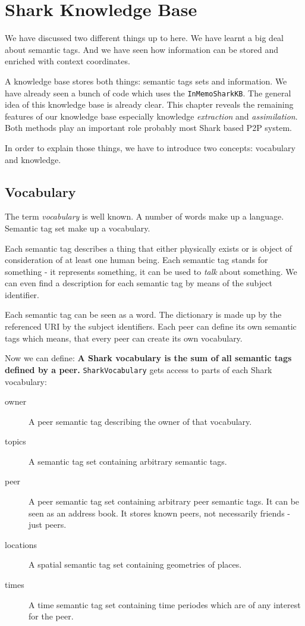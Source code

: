 \chapter{Shark Knowledge Base}
\label{sec:sharkkb}
We have discussed two different things up to here. We have learnt a big deal about semantic tags. And we have seen how information can be stored and enriched with context coordinates.

A knowledge base stores both things: semantic tags sets and information. We have already seen a bunch of code which uses the {\tt InMemoSharkKB}. The general idea of this knowledge base is already clear. This chapter reveals the remaining features of our knowledge base especially knowledge {\it extraction} and {\it assimilation}. Both methods play an important role probably most Shark based P2P system.

In order to explain those things, we have to introduce two concepts: vocabulary and knowledge.

\section{Vocabulary}
The term {\it vocabulary} is well known. A number of words make up a language. Semantic tag set make up a vocabulary.

Each semantic tag describes a thing that either physically exists or is object of consideration of at least one human being. Each semantic tag stands for something - it represents something, it can be used to {\it talk} about something. We can even find a description for each semantic tag by means of the subject identifier. 

Each semantic tag can be seen as a word. The dictionary is made up by the referenced URI by the subject identifiers. Each peer can define its own semantic tags which means, that every peer can create its own vocabulary.

Now we can define: {\bf A Shark vocabulary is the sum of all semantic tags defined by a peer.} {\tt SharkVocabulary} gets access to parts of each Shark vocabulary:

\begin{description}
\item[owner] A peer semantic tag describing the owner of that vocabulary.
\item[topics] A semantic tag set containing arbitrary semantic tags.
\item[peer] A peer semantic tag set containing arbitrary peer semantic tags.
It can be seen as an address book. It stores known peers, not necessarily friends - just peers.
\item[locations] A spatial semantic tag set containing geometries of places.
\item[times] A time semantic tag set containing time periodes which are of any interest for the peer.
\end{description}

